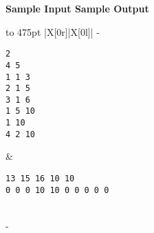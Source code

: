 \documentclass[a4paper,11pt]{article}
\begin{document}
\bf{Sample Input} \hspace{52mm} \bf{Sample Output}\vspace{1mm}\\
\begin{tabu*} to 475pt {|X[0r]|X[0l]|}
\tabucline-
\vspace{-\baselineskip} %
\begin{Verbatim}
2
4 5
1 1 3
2 1 5
3 1 6
1 5 10
1 10
4 2 10
\end{Verbatim}
&
\vspace{-\baselineskip} %
\begin{Verbatim}
13 15 16 10 10
0 0 0 10 10 0 0 0 0 0
\end{Verbatim}
\\
\tabucline-
\end{tabu*}
\end{document}
